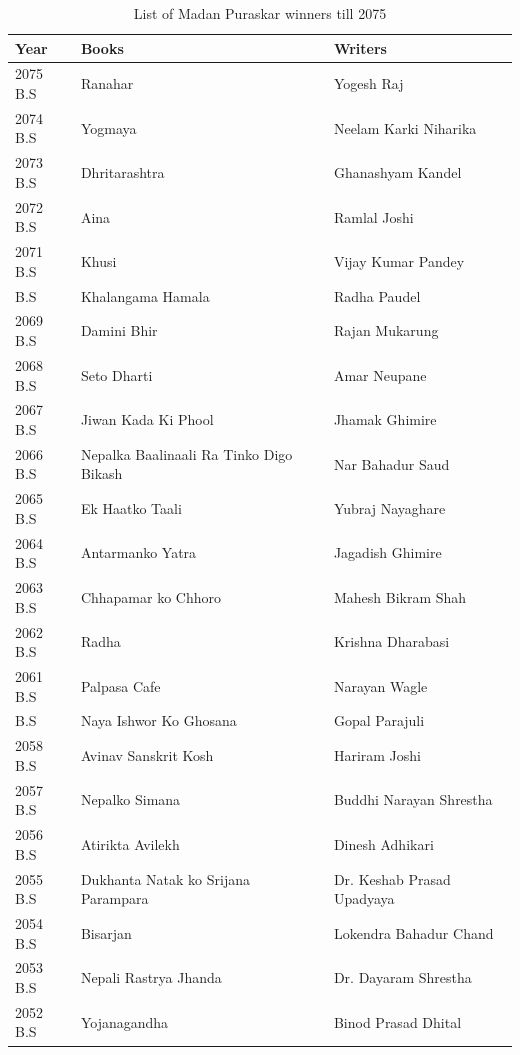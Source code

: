 \documentclass[
  openany]{book}
\begin{document}
\begin{longtable}[t]{l>{\raggedright\arraybackslash}p{14em}>{\raggedright\arraybackslash}p{24em}}
\caption{\label{tab:winners-list}List of Madan Puraskar winners till 2075}\\
\toprule
Year & Books & Writers\\
\midrule
\rowcolor{gray!6}  2075 B.S & Ranahar & Yogesh Raj\\
2074 B.S & Yogmaya & Neelam Karki Niharika\\
\rowcolor{gray!6}  2073 B.S & Dhritarashtra & Ghanashyam Kandel\\
2072 B.S & Aina & Ramlal Joshi\\
\rowcolor{gray!6}  2071 B.S & Khusi & Vijay Kumar Pandey\\
\addlinespace
2070 B.S & Khalangama Hamala & Radha Paudel\\
\rowcolor{gray!6}  2069 B.S & Damini Bhir & Rajan Mukarung\\
2068 B.S & Seto Dharti & Amar Neupane\\
\rowcolor{gray!6}  2067 B.S & Jiwan Kada Ki Phool & Jhamak Ghimire\\
2066 B.S & Nepalka Baalinaali Ra Tinko Digo Bikash & Nar Bahadur Saud\\
\addlinespace
\rowcolor{gray!6}  2065 B.S & Ek Haatko Taali & Yubraj Nayaghare\\
2064 B.S & Antarmanko Yatra & Jagadish Ghimire\\
\rowcolor{gray!6}  2063 B.S & Chhapamar ko Chhoro & Mahesh Bikram Shah\\
2062 B.S & Radha & Krishna Dharabasi\\
\rowcolor{gray!6}  2061 B.S & Palpasa Cafe & Narayan Wagle\\
\addlinespace
2060 B.S & Naya Ishwor Ko Ghosana & Gopal Parajuli\\
\rowcolor{gray!6}  2058 B.S & Avinav Sanskrit Kosh & Hariram Joshi\\
2057 B.S & Nepalko Simana & Buddhi Narayan Shrestha\\
\rowcolor{gray!6}  2056 B.S & Atirikta Avilekh & Dinesh Adhikari\\
2055 B.S & Dukhanta Natak ko Srijana Parampara & Dr. Keshab Prasad Upadyaya\\
\addlinespace
\rowcolor{gray!6}  2054 B.S & Bisarjan & Lokendra Bahadur Chand\\
2053 B.S & Nepali Rastrya Jhanda & Dr. Dayaram Shrestha\\
\rowcolor{gray!6}  2052 B.S & Yojanagandha & Binod Prasad Dhital\\

\end{longtable}
\end{document}
